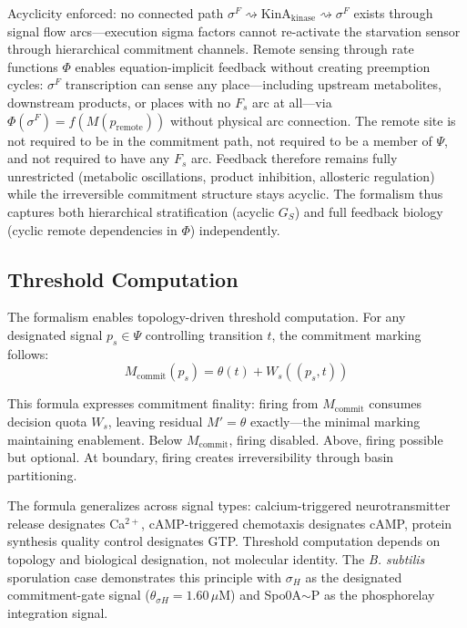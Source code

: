 \documentclass[10pt,letterpaper]{article}
\providecommand{\DIFaddtex}[1]{{\protect\color{blue}\uwave{#1}}} %
\providecommand{\DIFdeltex}[1]{{\protect\color{red}\sout{#1}}}                      %
\providecommand{\DIFaddbegin}{} %
\providecommand{\DIFaddend}{} %
\providecommand{\DIFdelbegin}{} %
\providecommand{\DIFdelend}{} %
\providecommand{\DIFadd}[1]{\texorpdfstring{\DIFaddtex{#1}}{#1}} %
\providecommand{\DIFdel}[1]{\texorpdfstring{\DIFdeltex{#1}}{}} %
\newcommand{\DIFscaledelfig}{0.5}
\newlength{\DIFdelgraphicswidth} %
\newlength{\DIFdelgraphicsheight} %
\newcommand{\DIFaddincludegraphics}[2][]{{\color{blue}\fbox{\DIFOincludegraphics[#1]{#2}}}} %
\newcommand{\DIFdelincludegraphics}[2][]{%
\sbox{\DIFdelgraphicsbox}{\DIFOincludegraphics[#1]{#2}}%
\settoboxwidth{\DIFdelgraphicswidth}{\DIFdelgraphicsbox} %
\settoboxtotalheight{\DIFdelgraphicsheight}{\DIFdelgraphicsbox} %
\scalebox{\DIFscaledelfig}{%
\parbox[b]{\DIFdelgraphicswidth}{\usebox{\DIFdelgraphicsbox}\\[-\baselineskip] \rule{\DIFdelgraphicswidth}{0em}}\llap{\resizebox{\DIFdelgraphicswidth}{\DIFdelgraphicsheight}{%
\setlength{\unitlength}{\DIFdelgraphicswidth}%
\begin{picture}(1,1)%
\thicklines\linethickness{2pt} %
{\color[rgb]{1,0,0}\put(0,0){\framebox(1,1){}}}%
{\color[rgb]{1,0,0}\put(0,0){\line( 1,1){1}}}%
{\color[rgb]{1,0,0}\put(0,1){\line(1,-1){1}}}%
\end{picture}%
}\hspace*{3pt}}} %
} %
\DeclareRobustCommand{\DIFaddbegin}{\DIFOaddbegin \let\includegraphics\DIFaddincludegraphics} %
\DeclareRobustCommand{\DIFaddend}{\DIFOaddend \let\includegraphics\DIFOincludegraphics} %
\DeclareRobustCommand{\DIFdelbegin}{\DIFOdelbegin \let\includegraphics\DIFdelincludegraphics} %
\DeclareRobustCommand{\DIFdelend}{\DIFOaddend \let\includegraphics\DIFOincludegraphics} %
\begin{document}
Acyclicity enforced: no connected path $\sigma^F \rightsquigarrow \text{KinA}_{\text{kinase}} \rightsquigarrow \sigma^F$ exists through signal flow arcs---execution sigma factors cannot re-activate the starvation sensor through hierarchical commitment channels. Remote sensing through rate functions $\Phi$ enables equation-implicit feedback without creating preemption cycles: $\sigma^F$ transcription can sense any place---including upstream metabolites, downstream products, or places with no $F_s$ arc at all---via $\Phi(\sigma^F) = f(M(p_{\text{remote}}))$ without physical arc connection. The remote site is not required to be in the commitment path, not required to be a member of $\Psi$, and not required to have any $F_s$ arc. Feedback therefore remains fully unrestricted (metabolic oscillations, product inhibition, allosteric regulation) while the irreversible commitment structure stays acyclic. The formalism thus captures both hierarchical stratification (acyclic \DIFdelbegin \DIFdel{$G_S$}\DIFdelend \DIFaddbegin \DIFadd{$G_s$}\DIFaddend ) and full feedback biology (cyclic remote dependencies in $\Phi$) independently.

\subsection{Threshold Computation}

The formalism enables topology-driven threshold computation. For any designated signal $p_s \in \Psi$ controlling transition $t$, the commitment marking follows:
\begin{equation}
M_{\text{commit}}(p_s) = \theta(t) + W_s((p_s,t))
\end{equation}

This formula expresses commitment finality: firing from $M_{\text{commit}}$ consumes decision quota $W_s$, leaving residual $M' = \theta$ exactly---the minimal marking maintaining enablement. Below $M_{\text{commit}}$, firing disabled. Above, firing possible but optional. At boundary, firing creates irreversibility through basin partitioning.

The formula generalizes across signal types: calcium-triggered neurotransmitter release designates Ca$^{2+}$, cAMP-triggered chemotaxis designates cAMP, protein synthesis quality control designates GTP. Threshold computation depends on topology and biological designation, not molecular identity. The \textit{B. subtilis} sporulation case demonstrates this principle with $\sigma_H$ as the designated commitment-gate signal ($\theta_{\sigma H} = 1.60\,\mu$M) and Spo0A$\sim$P as the phosphorelay integration signal.
\end{document}
